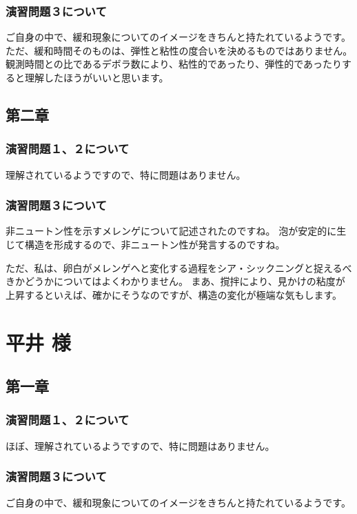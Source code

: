 \documentclass[uplatex,dvipdfmx,a4paper,11pt]{jsreport}
\begin{document}
\subsubsection*{演習問題３について}

ご自身の中で、緩和現象についてのイメージをきちんと持たれているようです。
ただ、緩和時間そのものは、弾性と粘性の度合いを決めるものではありません。
観測時間との比であるデボラ数により、粘性的であったり、弾性的であったりすると理解したほうがいいと思います。


\subsection*{第二章}
\subsubsection*{演習問題１、２について}
理解されているようですので、特に問題はありません。

\subsubsection*{演習問題３について}

非ニュートン性を示すメレンゲについて記述されたのですね。
泡が安定的に生じて構造を形成するので、非ニュートン性が発言するのですね。

ただ、私は、卵白がメレンゲへと変化する過程をシア・シックニングと捉えるべきかどうかについてはよくわかりません。
まあ、撹拌により、見かけの粘度が上昇するといえば、確かにそうなのですが、構造の変化が極端な気もします。

\clearpage
\section*{平井 様}
\subsection*{第一章}
\subsubsection*{演習問題１、２について}
ほぼ、理解されているようですので、特に問題はありません。

\subsubsection*{演習問題３について}

ご自身の中で、緩和現象についてのイメージをきちんと持たれているようです。
\end{document}
